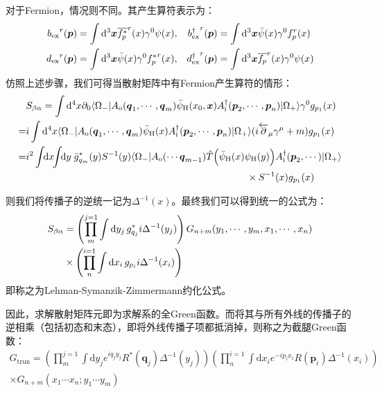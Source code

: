 对于Fermion，情况则不同。其产生算符表示为：
\begin{align}
{b_{\text{ex}}}^r(\boldsymbol{p})&=\int\mathrm{d}^3\boldsymbol{x}\overline{f_p^*}^r(x)\gamma^0\psi(x), &{b_{\text{ex}}^\dagger}^r(\boldsymbol{p})&=\int\mathrm{d}^3\boldsymbol{x}\bar{\psi}(x)\gamma^0 f^r_p(x)\notag\\
{d_{\text{ex}}}^r(\boldsymbol{p})&=\int\mathrm{d}^3\boldsymbol{x}\bar{\psi}(x)\gamma^0{f_p^*}^r(x), &{d_{\text{ex}}^\dagger}^r(\boldsymbol{p})&=\int\mathrm{d}^3\boldsymbol{x}\overline{f_p}^r(x)\gamma^0\psi(x)
\end{align}
仿照上述步骤，我们可得当散射矩阵中有Fermion产生算符的情形：
	\begin{align}
	&S_{\beta\alpha}=\int\mathrm{d}^4{x}\partial_0\langle\Omega_-|A_{\text{o}}(\boldsymbol{q}_1,\cdots,\boldsymbol{q}_m)\bar{\psi}_{\text{H}}(x_0,\boldsymbol{x})A^\dagger_{\text{i}}(\boldsymbol{p}_2,\cdots,\boldsymbol{p}_n)|\Omega_+\rangle \gamma^0 g_{{p}_1}(x)\notag\\
	=&i\int\mathrm{d}^4x\langle\Omega_-|A_{\text{o}}(\boldsymbol{q}_1,\cdots,\boldsymbol{q}_m)\bar{\psi}_{\text{H}}(x)A^\dagger_{\text{i}}(\boldsymbol{p}_2,\cdots,\boldsymbol{p}_n)|\Omega_+\rangle (i\overleftarrow{\partial}_\mu{\gamma^\mu}+m)g_{{p}_1}(x)\notag\\
	=&i^2\int\!\!\mathrm{d}x\!\!\int\!\!\mathrm{d}y\;\bar{g}^*_{{q}_m}(y)S^{-1}(y)\langle\Omega_-|A_{\text{o}}(\cdots\boldsymbol{q}_{m-1})\hat{T}\Big(\bar{\psi}_{\text{H}}(x)\psi_{\text{H}}(y)\Big)A^\dagger_{\text{i}}(\boldsymbol{p}_2,\cdots)|\Omega_+\rangle\notag\\&\hspace{8cm} \times S^{-1}(x)g_{{p}_1}(x)
	\end{align}

则我们将传播子的逆统一记为$\Delta^{-1}(x)$。最终我们可以得到统一的公式为：
\begin{align}
S_{\beta\alpha}&=\left(\prod_{m}^{j=1}\int\mathrm{d}y_j\,g^*_{{q}_j}i\Delta^{-1}(y_j)\right)G_{n+m}(y_1,\cdots,y_m,x_1,\cdots,x_n)\notag\\
&\times\left(\prod_{n}^{i=1}\int\mathrm{d}x_i\,g_{{p}_i}i\Delta^{-1}(x_i)\right)
\end{align}
即称之为Lehman-Symanzik-Zimmermann约化公式。

因此，求解散射矩阵元即为求解系的全Green函数。而将其与所有外线的传播子的逆相乘（包括初态和末态），即将外线传播子项都抵消掉，则称之为截腿Green函数：
\begin{multline}
G_{\text{trun}}=\left(\prod_{m}^{j=1}\int\mathrm{d}y_je^{iq_jy_j}R^*(\boldsymbol{q}_j)\Delta^{-1}(y_j)\right)\left(\prod_{n}^{i=1}\int\mathrm{d}x_ie^{-ip_ix_i}R(\boldsymbol{p}_i)\Delta^{-1}(x_i)\right)\\
\times G_{n+m}(x_1\cdots x_n;y_1\cdots y_m)
\end{multline}
